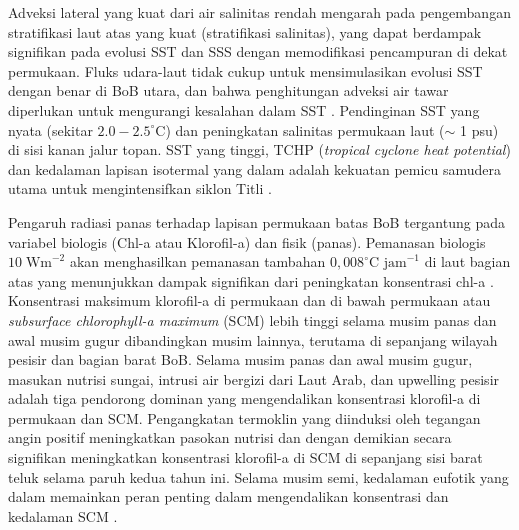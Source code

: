 \begin{spacing}{1.5}
	Adveksi lateral yang kuat dari air salinitas rendah mengarah pada pengembangan stratifikasi laut atas yang kuat (stratifikasi salinitas), yang dapat berdampak signifikan pada evolusi SST dan SSS dengan memodifikasi pencampuran di dekat permukaan. Fluks udara-laut tidak cukup untuk mensimulasikan evolusi SST dengan benar di BoB utara, dan bahwa penghitungan adveksi air tawar diperlukan untuk mengurangi kesalahan dalam SST . Pendinginan SST yang nyata (sekitar $2.0 - 2.5^\circ$C) dan peningkatan salinitas permukaan laut ($\sim$ 1 psu) di sisi kanan jalur topan. SST yang tinggi, TCHP (\textit{tropical cyclone heat potential}) dan kedalaman lapisan isotermal yang dalam adalah kekuatan pemicu samudera utama untuk mengintensifkan siklon Titli . 
	
	Pengaruh radiasi panas terhadap lapisan permukaan batas BoB tergantung pada variabel biologis (Chl-a atau Klorofil-a) dan fisik (panas). Pemanasan biologis $10\; \text{Wm}^{-2}$ akan menghasilkan pemanasan tambahan $0,008^\circ \text{C jam}^{-1}$ di laut bagian atas yang menunjukkan dampak signifikan dari peningkatan konsentrasi chl-a . Konsentrasi maksimum klorofil-a di permukaan dan di bawah permukaan atau \textit{subsurface chlorophyll-a maximum} (SCM) lebih tinggi selama musim panas dan awal musim gugur dibandingkan musim lainnya, terutama di sepanjang wilayah pesisir dan bagian barat BoB. Selama musim panas dan awal musim gugur, masukan nutrisi sungai, intrusi air bergizi dari Laut Arab, dan upwelling pesisir adalah tiga pendorong dominan yang mengendalikan konsentrasi klorofil-a di permukaan dan SCM. Pengangkatan termoklin yang diinduksi oleh tegangan angin positif meningkatkan pasokan nutrisi dan dengan demikian secara signifikan meningkatkan konsentrasi klorofil-a di SCM di sepanjang sisi barat teluk selama paruh kedua tahun ini. Selama musim semi, kedalaman eufotik yang dalam memainkan peran penting dalam mengendalikan konsentrasi dan kedalaman SCM .
	

\end{spacing}
